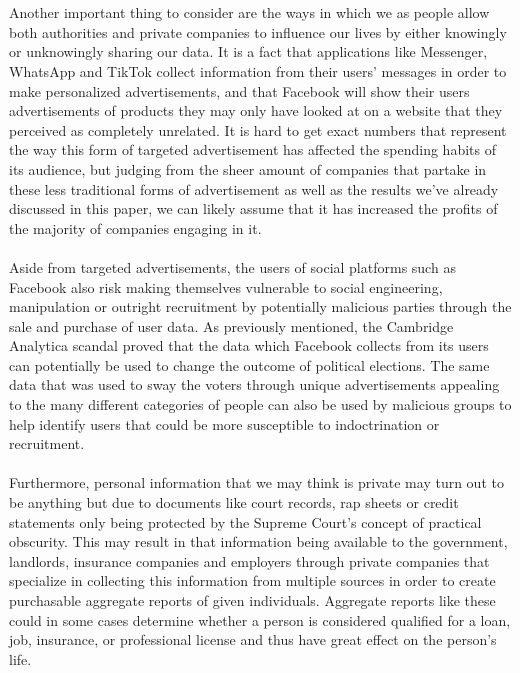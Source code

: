 \documentclass[11pt]{article}
\begin{document}
\\ \\
Another important thing to consider are the ways in which we as people allow both authorities and private companies to influence our lives by either knowingly or unknowingly sharing our data. It is a fact that applications like Messenger, WhatsApp and TikTok collect information from their users’ messages in order to make personalized advertisements, and that Facebook will show their users advertisements of products they may only have looked at on a website that they perceived as completely unrelated. It is hard to get exact numbers that represent the way this form of targeted advertisement has affected the spending habits of its audience, but judging from the sheer amount of companies that partake in these less traditional forms of advertisement as well as the results we’ve already discussed in this paper, we can likely assume that it has increased the profits of the majority of companies engaging in it.
\\ \\
Aside from targeted advertisements, the users of social platforms such as Facebook also risk making themselves vulnerable to social engineering, manipulation or outright recruitment by potentially malicious parties through the sale and purchase of user data. As previously mentioned, the Cambridge Analytica scandal proved that the data which Facebook collects from its users can potentially be used to change the outcome of political elections. The same data that was used to sway the voters through unique advertisements appealing to the many different categories of people can also be used by malicious groups to help identify users that could be more susceptible to indoctrination or recruitment. 
\\ \\
Furthermore, personal information that we may think is private may turn out to be anything but due to documents like court records, rap sheets or credit statements only being protected by the Supreme Court's concept of practical obscurity. This may result in that information being available to the government, landlords, insurance companies and employers through private companies that specialize in collecting this information from multiple sources in order to create purchasable aggregate reports of given individuals. Aggregate reports like these could in some cases determine whether a person is considered qualified for a loan, job, insurance, or professional license and thus have great effect on the person’s life.
\end{document}
